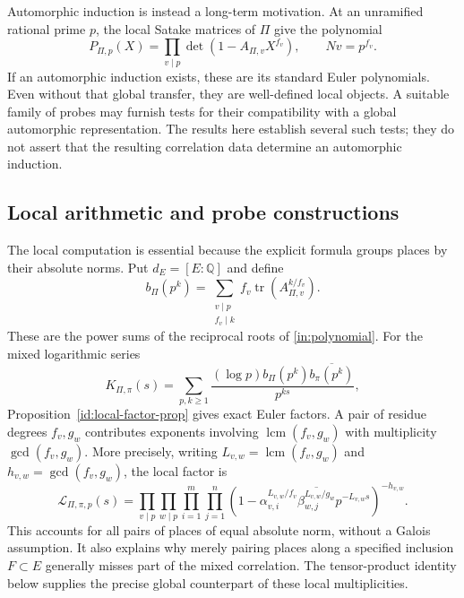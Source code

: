\documentclass[11pt,reqno]{amsart}
\numberwithin{equation}{section}
\theoremstyle{definition}
\theoremstyle{remark}
\begin{document}
Automorphic induction is instead a long-term motivation. At an unramified rational prime $p$, the local Satake matrices of $\Pi$ give the polynomial
\begin{equation}P_{\Pi,p}(X)=\prod_{v\mid p}\det(1-A_{\Pi,v}X^{f_v}),\qquad Nv=p^{f_v}.\label{in:polynomial}\end{equation}
If an automorphic induction exists, these are its standard Euler polynomials. Even without that global transfer, they are well-defined local objects. A suitable family of probes may furnish tests for their compatibility with a global automorphic representation. The results here establish several such tests; they do not assert that the resulting correlation data determine an automorphic induction.

\subsection{Local arithmetic and probe constructions}
The local computation is essential because the explicit formula groups places by their absolute norms. Put $d_E=[E:\mathbb Q]$ and define
\begin{equation}b_\Pi(p^k)=\sum_{\substack{v\mid p\\f_v\mid k}}f_v\operatorname{tr}(A_{\Pi,v}^{k/f_v}).\label{in:b}\end{equation}
These are the power sums of the reciprocal roots of \eqref{in:polynomial}. For the mixed logarithmic series
\begin{equation}K_{\Pi,\pi}(s)=\sum_{p,k\ge1}\frac{(\log p)b_\Pi(p^k)\overline{b_\pi(p^k)}}{p^{ks}},\label{in:K}\end{equation}
Proposition~\ref{id:local-factor-prop} gives exact Euler factors. A pair of residue degrees $f_v,g_w$ contributes exponents involving $\operatorname{lcm}(f_v,g_w)$ with multiplicity $\gcd(f_v,g_w)$. More precisely, writing $L_{v,w}=\operatorname{lcm}(f_v,g_w)$ and $h_{v,w}=\gcd(f_v,g_w)$, the local factor is
\begin{equation}\label{in:local-factor}
\mathscr L_{\Pi,\pi,p}(s)=
\prod_{v\mid p}\prod_{w\mid p}\prod_{i=1}^{m}\prod_{j=1}^{n}
\left(1-\alpha_{v,i}^{L_{v,w}/f_v}
\overline{\beta_{w,j}^{L_{v,w}/g_w}}p^{-L_{v,w}s}\right)^{-h_{v,w}}.
\end{equation}
This accounts for all pairs of places of equal absolute norm, without a Galois assumption. It also explains why merely pairing places along a specified inclusion $F\subset E$ generally misses part of the mixed correlation. The tensor-product identity below supplies the precise global counterpart of these local multiplicities.
\end{document}
